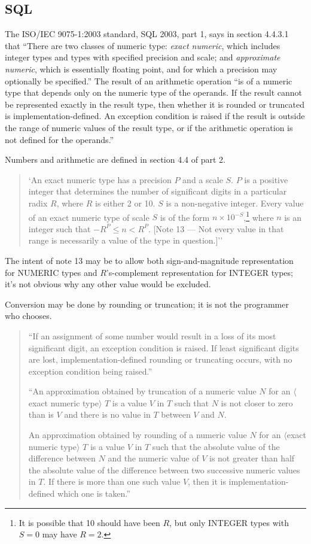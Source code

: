 \documentclass{article}
\begin{document}
\subsection{SQL}

The ISO/IEC 9075-1:2003 standard, SQL 2003, part 1,
says in section 4.4.3.1 that ``There are two classes of numeric
type: {\it exact numeric}, which includes integer types and types
with specified precision and scale; and {\it approximate numeric},
which is essentially floating point, and for which a precision may
optionally be specified.''  The result of an arithmetic operation
``is of a numeric type that depends only on the numeric type of the
operands.  If the result cannot be represented exactly in the result
type, then whether it is rounded or truncated is implementation-defined.
An exception condition is raised if the result is outside the range of
numeric values of the result type, or if the arithmetic operation is not
defined for the operands.''

Numbers and arithmetic are defined in
section 4.4 of part 2.
\begin{quote}
`An exact numeric type has a precision
$P$ and a scale $S$.  $P$ is a positive integer that determines
the number of significant digits in a particular radix $R$,
where $R$ is either 2 or 10.  $S$ is a non-negative integer.
Every value of an exact numeric type of scale $S$ is of the
form $n\times 10^{-S}$,\footnote{It is possible that 10 should
have been $R$, but only INTEGER types with $S=0$ may have $R=2$.}
where $n$ is an integer such that $-R^P \le n < R^P$.
[Note 13 --- Not every value in that range is necessarily a
value of the type in question.]''
\end{quote}
The intent of note 13 may be to allow both sign-and-magnitude
representation for NUMERIC types and $R$'s-complement representation
for INTEGER types; it's not obvious why any other value would be
excluded.

Conversion may be done by rounding or truncation; it is not the
programmer who chooses.
\begin{quote}
``If an assignment of some number would result in a loss of its most
significant digit, an exception condition is raised.  If least
significant digits are lost, implementation-defined rounding or
truncating occurs, with no exception condition being raised.''

``An approximation obtained by truncation of a numeric value $N$ for an
$\langle$exact numeric type$\rangle$ $T$ is a value $V$ in $T$
such that $N$ is not closer to
zero than is $V$ and there is no value in $T$ between $V$ and $N$.

An approximation obtained by rounding of a numeric value $N$ for an
$\langle$exact numeric type$\rangle$ $T$ is a value $V$ in $T$
such that the absolute value of the difference between $N$
and the numeric value of $V$ is not greater than half
the absolute value of the difference between two successive numeric
values in $T$. If there is more than one such value $V$, then it is
implementation-defined which one is taken.''
\end{quote}
\end{document}
